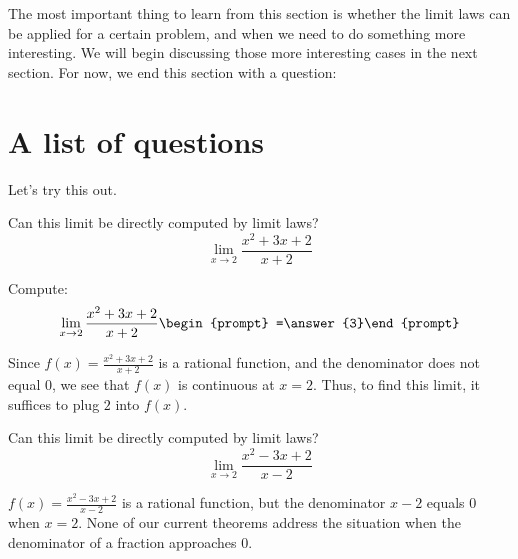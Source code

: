 \documentclass{ximera}
\begin{document}
The most important thing to learn from this section is whether the
limit laws can be applied for a certain problem, and when we need to
do something more interesting.  We will begin discussing those more
interesting cases in the next section.  For now, we end this section
with a question:

\section{A list of questions}

Let's try this out.

\begin{question}
  Can this limit be directly computed by limit laws?
  \[
  \displaystyle\lim_{x\to 2}\frac{x^2+3x+2}{x+2} 
  \]
  \begin{multipleChoice}
  \end{multipleChoice}
  \begin{question}
    Compute:
    \[
    \displaystyle\lim_{x\to 2}\frac{x^2+3x+2}{x+2}\begin{prompt} =\answer{3}\end{prompt}
    \]
    \begin{feedback}
      Since $f(x)=\frac{x^2+3x+2}{x+2}$ is a rational function, and
      the denominator does not equal $0$, we see that $f(x)$ is
      continuous at $x=2$.  Thus, to find this limit, it suffices to
      plug $2$ into $f(x)$.
    \end{feedback}
  \end{question}
\end{question}


\begin{question}
  Can this limit be directly computed by limit laws?
  \[
  \displaystyle\lim_{x\to 2}\frac{x^2-3x+2}{x-2}
  \]
  \begin{multipleChoice}
  \end{multipleChoice}
  \begin{feedback}
    $f(x) = \frac{x^2-3x+2}{x-2}$ is a rational function, but the
    denominator $x-2$ equals $0$ when $x=2$. None of our current
    theorems address the situation when the denominator of a fraction
    approaches $0$.
  \end{feedback}
\end{question}
\end{document}
